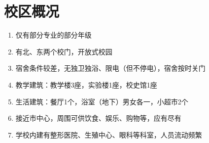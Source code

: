 
\section[校区概况]{校区概况}
\begin{enumerate}
    \item 仅有部分专业的部分年级
    \item 有北、东两个校门，开放式校园\footnotemark
    \item 宿舍条件较差，无独卫独浴、限电（但不停电），宿舍按时关门
    \item 教学建筑：教学楼3座，实验楼1座，校史馆1座
    \item 生活建筑：餐厅1个，浴室（地下）男女各一，小超市2个
    \item 接近市中心，周围可供饮食、娱乐、购物等，应有尽有
    \item 学校内建有整形医院、生殖中心、眼科等科室，人员流动频繁
\end{enumerate}